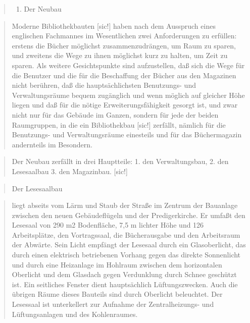 \documentclass[a4paper,
fontsize=11pt,
oneside,
numbers=noperiodatend,
parskip=half-,
bibliography=totoc,
final
]{scrartcl}
\begin{document}
\begin{quote}
\begin{enumerate}
\def\labelenumi{\Roman{enumi}.}
\setcounter{enumi}{1}
\itemsep1pt\parskip0pt
\item
  Der Neubau
\end{enumerate}
\end{quote}

\begin{quote}
Moderne Bibliothekbauten {[}sic!{]} haben nach dem Ausspruch eines
englischen Fachmannes im Wesentlichen zwei Anforderungen zu erfüllen:
erstens die Bücher möglichst zusammenzudrängen, um Raum zu sparen, und
zweitens die Wege zu ihnen möglichst kurz zu halten, um Zeit zu sparen.
Als weitere Gesichtspunkte sind aufzustellen, daß sich die Wege für die
Benutzer und die für die Beschaffung der Bücher aus den Magazinen nicht
berühren, daß die hauptsächlichsten Benutzungs- und Verwaltungsräume
bequem zugänglich und wenn möglich auf gleicher Höhe liegen und daß für
die nötige Erweiterungsfähigkeit gesorgt ist, und zwar nicht nur für das
Gebäude im Ganzen, sondern für jede der beiden Raumgruppen, in die ein
Bibliothekbau {[}sic!{]} zerfällt, nämlich für die Benutzungs- und
Verwaltungsräume einesteils und für das Büchermagazin andernteils im
Besondern.
\end{quote}

\begin{quote}
Der Neubau zerfällt in drei Hauptteile: 1. den Verwaltungsbau, 2. den
Lesesaalbau 3. den Magazinbau. {[}sic!{]}
\end{quote}

\begin{quote}
Der Lesesaalbau
\end{quote}

\begin{quote}
liegt abseits vom Lärm und Staub der Straße im Zentrum der Bauanlage
zwischen den neuen Gebäudeflügeln und der Predigerkirche. Er umfaßt den
Lesesaal von 290 m2 Bodenfläche, 7,5 m lichter Höhe und 126
Arbeitsplätze, den Vortragssaal, die Bücherausgabe und den Arbeitsraum
der Abwärte. Sein Licht empfängt der Lesesaal durch ein Glasoberlicht,
das durch einen elektrisch betriebenen Vorhang gegen das direkte
Sonnenlicht und durch eine Heizanlage im Hohlraum zwischen dem
horizontalen Oberlicht und dem Glasdach gegen Verdunklung durch Schnee
geschützt ist. Ein seitliches Fenster dient hauptsächlich
Lüftungszwecken. Auch die übrigen Räume dieses Bauteils sind durch
Oberlicht beleuchtet. Der Lesessaal ist unterkellert zur Aufnahme der
Zentralheizungs- und Lüftungsanlagen und des Kohlenraumes.
\end{quote}
\end{document}
